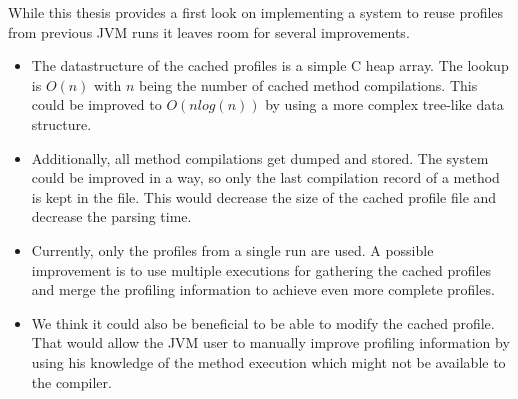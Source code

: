 While this thesis provides a first look on implementing a system to reuse profiles from previous JVM runs it leaves room for several improvements.
\begin{itemize}
  \item The datastructure of the cached profiles is a simple C heap array. The lookup is $O(n)$ with $n$ being the number of cached method compilations. This could be improved to $O(nlog(n))$ by using a more complex tree-like data structure.
  \item Additionally, all method compilations get dumped and stored. The system could be improved in a way, so only the last compilation record of a method is kept in the file. This would decrease the size of the cached profile file and decrease the parsing time.
  \item Currently, only the profiles from a single run are used. A possible improvement is to use multiple executions for gathering the cached profiles and merge the profiling information to achieve even more complete profiles.
  \item We think it could also be beneficial to be able to modify the cached profile. That would allow the JVM user to manually improve profiling information by using his knowledge of the method execution which might not be available to the compiler.
\end{itemize}

